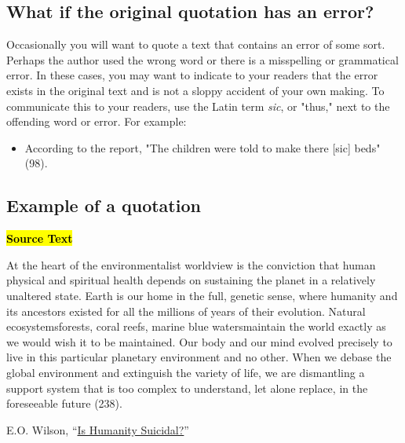 \subsection{What if the original quotation has an error?}

Occasionally you will want to quote a text that contains an error of some sort. Perhaps the author used the wrong word or there is a misspelling or grammatical error. In these cases, you may want to indicate to your readers that the error exists in the original text and is not a sloppy accident of your own making. To communicate this to your readers, use the Latin term \emph{sic}, or "thus," next to the offending word or error. For example:\medskip

\begin{itemize}
\item According to the report, "The children were told to make there [sic] beds" (98). 
\end{itemize}



\subsection{Example of a quotation}

\begin{tcolorbox}[enhanced,width=4.2in,left=.3in, right=.3in,
   drop fuzzy shadow southeast,
    boxrule=0.4pt,sharp corners,colframe=black!80!black,colback=white!10]

\medskip

{\small
\begin{doublespacing}
\textbf{\hl{Source Text}}
\smallskip

\hspace{.5cm}At the heart of the environmentalist worldview is the conviction that human physical and spiritual health depends on sustaining the planet in a relatively unaltered state. Earth is our home in the full, genetic sense, where humanity and its ancestors existed for all the millions of years of their evolution. Natural ecosystems\textemdash forests, coral reefs, marine blue waters\textemdash maintain the world exactly as we would wish it to be maintained. Our body and our mind evolved precisely to live in this particular planetary environment and no other. When we debase the global environment and extinguish the variety of life, we are dismantling a support system that is too complex to understand, let alone replace, in the foreseeable future (238).

\bigskip

\noindent\textemdash E.O. Wilson, “\href{https://doi-org.dartmouth.idm.oclc.org/10.1016/0303-2647(93)90052-E}{Is Humanity Suicidal?}”

\bigskip

\end{doublespacing}}

\end{tcolorbox}

